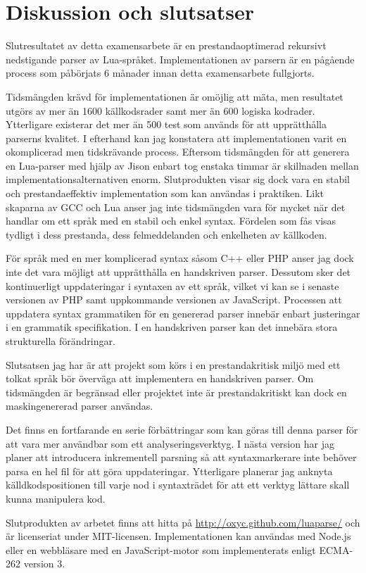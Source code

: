 \section{Diskussion och slutsatser}

Slutresultatet av detta examensarbete är en prestandaoptimerad rekursivt
nedstigande parser av Lua-språket. Implementationen av parsern är en pågående
process som påbörjats 6 månader innan detta examensarbete fullgjorts.

Tidsmängden krävd för implementationen är omöjlig att mäta, men resultatet
utgörs av mer än 1600 källkodsrader samt mer än 600 logiska kodrader.
Ytterligare existerar det mer än 500 test som används för att upprätthålla
parserns kvalitet. I efterhand kan jag konstatera att implementationen varit
en okomplicerad men tidskrävande process. Eftersom tidsmängden för att
generera en Lua-parser med hjälp av Jison enbart tog enstaka timmar är
skillnaden mellan implementationsalternativen enorm. Slutprodukten visar sig
dock vara en stabil och prestandaeffektiv implementation som kan användas i
praktiken. Likt skaparna av GCC och Lua anser jag inte tidsmängden vara för
mycket när det handlar om ett språk med en stabil och enkel syntax. Fördelen
som fås visas tydligt i dess prestanda, dess felmeddelanden och enkelheten av
källkoden.

För språk med en mer komplicerad syntax såsom C++ eller PHP anser jag dock
inte det vara möjligt att upprätthålla en handskriven parser. Dessutom sker
det kontinuerligt uppdateringar i syntaxen av ett språk, vilket vi kan se i
senaste versionen av PHP samt uppkommande versionen av JavaScript. Processen
att uppdatera syntax grammatiken för en genererad parser innebär enbart
justeringar i en grammatik specifikation. I en handskriven parser kan det
innebära stora strukturella förändringar.

Slutsatsen jag har är att projekt som körs i en prestandakritisk miljö med ett
tolkat språk bör överväga att implementera en handskriven parser. Om
tidsmängden är begränsad eller projektet inte är prestandakritiskt kan dock en
maskingenererad parser användas.

Det finns en fortfarande en serie förbättringar som kan göras till denna
parser för att vara mer användbar som ett analyseringsverktyg. I nästa version
har jag planer att introducera inkrementell parsning så att syntaxmarkerare
inte behöver parsa en hel fil för att göra uppdateringar. Ytterligare planerar
jag anknyta källdkodspositionen till varje nod i syntaxträdet för att ett
verktyg lättare skall kunna manipulera kod.

Slutprodukten av arbetet finns att hitta på
\url{http://oxyc.github.com/luaparse/} och är licenseriat under MIT-licensen.
Implementationen kan användas med Node.js eller en webbläsare med en
JavaScript-motor som implementerats enligt ECMA-262 version 3.

